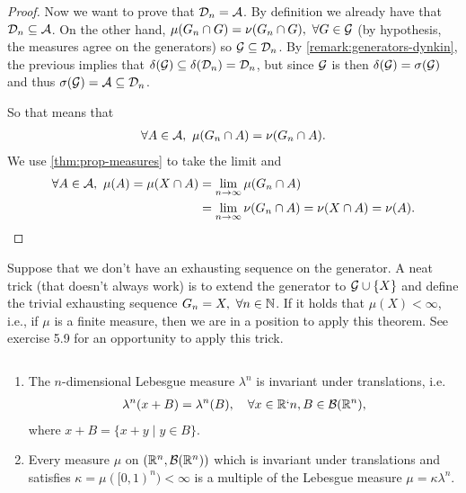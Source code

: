 \begin{proof}
	Now we want to prove that $\mathcal{D}_n = \mathcal{A}$. By definition we already have that $\mathcal{D}_n \subseteq \mathcal{A}$. On the other hand, $\mu(G_n \cap G) = \nu(G_n \cap G),\ \forall G \in \mathcal{G}$ (by hypothesis, the measures agree on the generators) so $\mathcal{G} \subseteq \mathcal{D}_n$. By \autoref{remark:generators-dynkin}, the previous implies that $\delta(\mathcal{G}) \subseteq \delta(\mathcal{D}_n) = \mathcal{D}_n$, but since $\mathcal{G}$ is \istable then $\delta(\mathcal{G}) = \sigma(\mathcal{G})$ and thus $\sigma(\mathcal{G}) = \mathcal{A} \subseteq \mathcal{D}_n$.
	
	So that means that
	\begin{align*}
		\forall A \in \mathcal{A},\ \mu(G_n \cap A) = \nu(G_n \cap A).
	\end{align*}
	We use \autoref{thm:prop-measures} to take the limit and
	\begin{align*}
		\forall A \in \mathcal{A},\ \mu(A)
		= \mu(X \cap A)
		&= \lim_{n\to\infty} \mu(G_n \cap A)\\
		&= \lim_{n\to\infty} \nu(G_n \cap A)
		= \nu(X \cap A)
		= \nu(A).
	\end{align*}
\end{proof}

Suppose that we don't have an exhausting sequence on the generator. A neat trick (that doesn't always work) is to extend the generator to $\mathcal{G} \cup \{X\}$ and define the trivial exhausting sequence $G_n = X,\ \forall n \in \mathbb{N}$. If it holds that $\mu(X) < \infty$, i.e., if $\mu$ is a finite measure, then we are in a position to apply this theorem. See exercise 5.9 for an opportunity to apply this trick.

\begin{lem}$ $\newline
	\label{lem:lebesgue-translation-invariant}
	\begin{enumerate}
		\item The $n$-dimensional Lebesgue measure $\lambda^n$ is invariant under translations, i.e.
		\begin{align*}
			\lambda^n(x + B) = \lambda^n(B),\quad \forall x \in \mathbb{R}`n, B \in \mathcal{B}(\mathbb{R}^n),
		\end{align*}
		where $x + B = \{x + y \mid y \in B\}$.
		
		\item Every measure $\mu$ on $(\mathbb{R}^n, \mathcal{B}(\mathbb{R}^n))$ which is invariant under translations and satisfies $\kappa = \mu([0,1)^n) < \infty$ is a multiple of the Lebesgue measure $\mu = \kappa \lambda^n$.
	\end{enumerate}
\end{lem}

